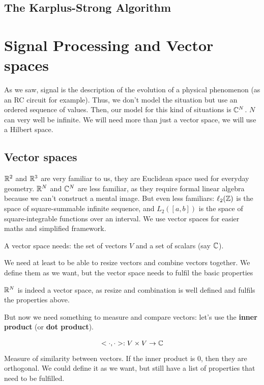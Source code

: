 \documentclass[11pt,a4paper]{article}
\numberwithin{equation}{section}
\begin{document}
\subsection{The Karplus-Strong Algorithm}

\section{Signal Processing and Vector spaces}
As we saw, signal is the description of the evolution of a physical phenomenon (as an RC circuit for example). Thus, we don't model the situation but use an ordered sequence of values. Then, our model for this kind of situations is $\mathbb{C}^N$. $N$ can very well be infinite. We will need more than just a vector space, we will use a Hilbert space.
\subsection{Vector spaces}
$\mathbb{R}^2$ and $\mathbb{R}^3$ are very familiar to us, they are Euclidean space used for everyday geometry. $\mathbb{R}^N$ and $\mathbb{C}^N$ are less familiar, as they require formal linear algebra because we can't construct a mental image. But even less familiars: $\ell_2(\mathbb{Z})$ is the space of square-summable infinite sequence, and $L_2([a,b])$ is the space of square-integrable functions over an interval. We use vector spaces for easier maths and simplified framework.

\begin{definition}
    A vector space needs: the set of vectors $V$ and a set of scalars (say $\mathbb{C}$).
    
    We need at least to be able to resize vectors and combine vectors together. We define them as we want, but the vector space needs to fulfil the basic properties
\end{definition}
\begin{example}
    $\mathbb{R}^N$ is indeed a vector space, as resize and combination is well defined and fulfils the properties above.
\end{example}
But now we need something to measure and compare vectors: let's use the \textbf{inner product} (or \textbf{dot product}).

\begin{definition}
    \begin{equation}
        <\cdot,\cdot>: V \times V \to \mathbb{C}
    \end{equation}
    Measure of similarity between vectors. If the inner product is 0, then they are orthogonal. We could define it as we want, but still have a list of properties that need to be fulfilled. 
\end{definition}
\end{document}
